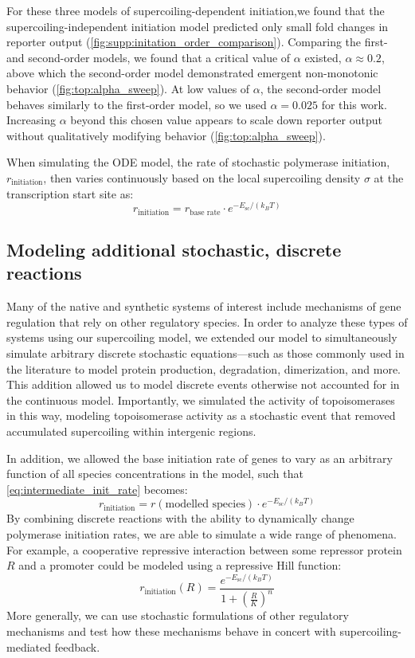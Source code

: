 \documentclass[11pt]{article}
\begin{document}
For these three models of supercoiling-dependent initiation,we found that the supercoiling-independent initiation model predicted only small fold changes in reporter output (\cref{fig:supp:initation_order_comparison}). Comparing the first- and second-order models, we found that a critical value of \(\alpha\) existed, \(\alpha \approx 0.2\), above which the second-order model demonstrated emergent non-monotonic behavior (\cref{fig:top:alpha_sweep}). At low values of \(\alpha\), the second-order model behaves similarly to the first-order model, so we used \(\alpha = 0.025\) for this work. Increasing \(\alpha\) beyond this chosen value appears to scale down reporter output without qualitatively modifying behavior (\cref{fig:top:alpha_sweep}).


When simulating the ODE model, the rate of stochastic polymerase initiation, \(r_\text{initiation}\), then varies continuously based on the local supercoiling density \(\sigma\) at the transcription start site as:
\begin{equation}
    r_\text{initiation} = r_\text{base rate} \cdot e^{- E_\text{sc} / (k_B T)}
\label{eq:intermediate_init_rate}
\end{equation}


\subsection{Modeling additional stochastic, discrete reactions}
Many of the native and synthetic systems of interest include mechanisms of gene regulation that rely on other regulatory species. In order to analyze these types of systems using our supercoiling model, we extended our model to simultaneously simulate arbitrary discrete stochastic equations---such as those commonly used in the literature to model protein production, degradation, dimerization, and more. This addition allowed us to model discrete events otherwise not accounted for in the continuous model. Importantly, we simulated the activity of topoisomerases in this way, modeling topoisomerase activity as a stochastic event that removed accumulated supercoiling within intergenic regions.

In addition, we allowed the base initiation rate of genes to vary as an arbitrary function of all species concentrations in the model, such that \cref{eq:intermediate_init_rate} becomes:
\begin{equation}
    r_\text{initiation} = r(\text{modelled species}) \cdot e^{- E_\text{sc} / (k_B T)}
\label{eq:final_init_rate}
\end{equation}
By combining discrete reactions with the ability to dynamically change polymerase initiation rates, we are able to simulate a wide range of phenomena.
For example, a cooperative repressive interaction between some repressor protein \(R\) and a promoter could be modeled using a repressive Hill function:
\[
    r_\text{initiation}(R) = \frac{e^{-E_\text{sc} / (k_B T)}}{1 + \left(\frac{R}{K}\right)^n}
\]
More generally, we can use stochastic formulations of other regulatory mechanisms and test how these mechanisms behave in concert with supercoiling-mediated feedback.
\end{document}
